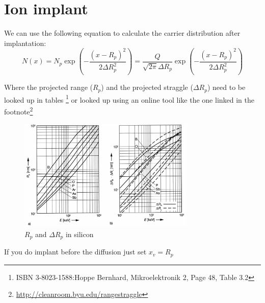 \section{Ion implant}
We can use the following equation to calculate the carrier distribution after implantation:
\begin{equation}
N(x)
=
N_p \exp\left(-\frac{(x-R_p)^2}{2\Delta R_p^2}\right)
=
\frac{Q}{\sqrt{2\pi}\Delta R_p}\exp\left(-\frac{(x-R_p)^2}{2\Delta R_p^2}\right)
\end{equation}

Where the projected range ($R_p$) and the projected straggle ($\Delta R_p$) need to be looked up in tables \footnote{ISBN 3-8023-1588:Hoppe Bernhard, Mikroelektronik 2, Page 48, Table 3.2} or looked up using an online tool like the one linked in the footnote\footnote{\url{http://cleanroom.byu.edu/rangestraggle}}

\begin{figure}[H]
	\centering
	\includegraphics[width=0.75\textwidth]{ion_implant.png}
	\caption{$R_p$ and $\Delta R_p$ in silicon}
	\label{graphics_range_and_straggle}
\end{figure}

\begin{mdframed}[linewidth=2pt,linecolor=red]
If you do implant before the diffusion just set $x_v=R_p$
\end{mdframed}
